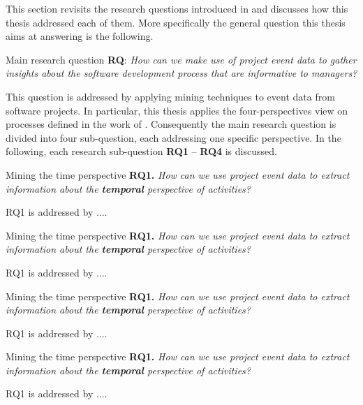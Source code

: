 This section revisits the research questions introduced in  and discusses how this thesis addressed each of them. More specifically the general question this thesis aims at answering is the following.
\begin{question}{Main research question}
	\textbf{RQ}: \emph{How can we make use of project event data to gather insights about the software development process that are informative to managers?} 
\end{question}

This question is addressed by applying mining techniques to event data from software projects. In particular, this thesis applies the four-perspectives view on processes defined in the work of \cite{DBLP:books/sp/Aalst16}. Consequently the main research question is divided into four sub-question, each addressing one specific perspective.  In the following, each research sub-question \textbf{RQ1} – \textbf{RQ4} is discussed. 

\begin{question}{Mining the time perspective}
\textbf{RQ1.} \emph{How can we use project event data to extract information about the \textbf{temporal} perspective of activities?}
\end{question}

RQ1 is addressed by ....


\begin{question}{Mining the time perspective}
	\textbf{RQ1.} \emph{How can we use project event data to extract information about the \textbf{temporal} perspective of activities?}
\end{question}

RQ1 is addressed by ....

\begin{question}{Mining the time perspective}
	\textbf{RQ1.} \emph{How can we use project event data to extract information about the \textbf{temporal} perspective of activities?}
\end{question}

RQ1 is addressed by ....
\begin{question}{Mining the time perspective}
	\textbf{RQ1.} \emph{How can we use project event data to extract information about the \textbf{temporal} perspective of activities?}
\end{question}

RQ1 is addressed by ....





